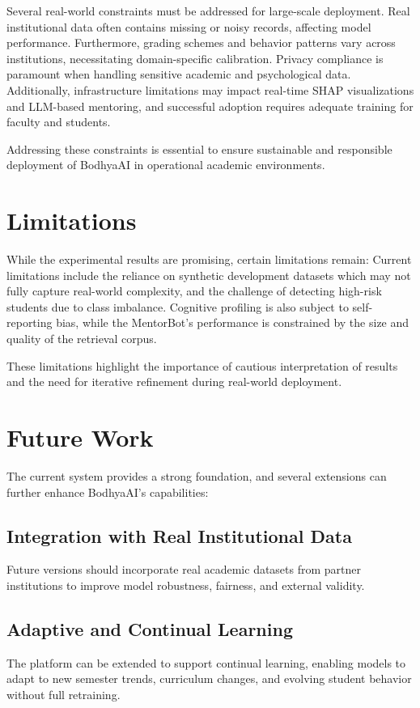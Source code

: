 \documentclass[12pt,a4paper]{report}
\begin{document}
Several real-world constraints must be addressed for large-scale deployment. Real institutional data often contains missing or noisy records, affecting model performance. Furthermore, grading schemes and behavior patterns vary across institutions, necessitating domain-specific calibration. Privacy compliance is paramount when handling sensitive academic and psychological data. Additionally, infrastructure limitations may impact real-time SHAP visualizations and LLM-based mentoring, and successful adoption requires adequate training for faculty and students.

Addressing these constraints is essential to ensure sustainable and responsible deployment
of BodhyaAI in operational academic environments.

\section{Limitations}

While the experimental results are promising, certain limitations remain:
Current limitations include the reliance on synthetic development datasets which may not fully capture real-world complexity, and the challenge of detecting high-risk students due to class imbalance. Cognitive profiling is also subject to self-reporting bias, while the MentorBot's performance is constrained by the size and quality of the retrieval corpus.

These limitations highlight the importance of cautious interpretation of results and the
need for iterative refinement during real-world deployment.

\section{Future Work}

The current system provides a strong foundation, and several extensions can further
enhance BodhyaAI’s capabilities:

\subsection{Integration with Real Institutional Data}
Future versions should incorporate real academic datasets from partner institutions to
improve model robustness, fairness, and external validity.

\subsection{Adaptive and Continual Learning}
The platform can be extended to support continual learning, enabling models to adapt to
new semester trends, curriculum changes, and evolving student behavior without full
retraining.
\end{document}
